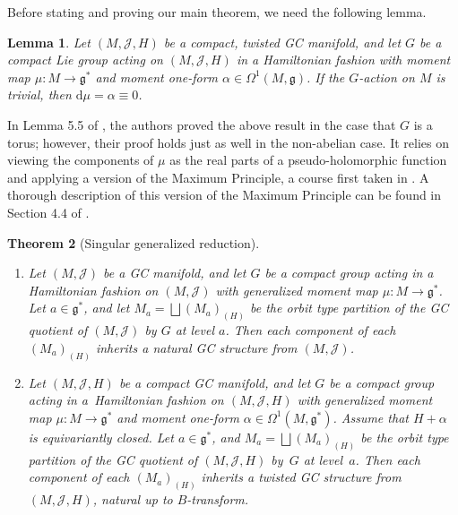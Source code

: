 \documentclass[pdftex]{sigma}
\newtheorem{Theorem}{Theorem}[section]
\newtheorem{Lemma}[Theorem]{Lemma}
\numberwithin{equation}{section}
\newcommand{\func}[3]{#1 \colon #2 \to #3}
\newcommand{\litlet}{\renewcommand{\labelenumi}{(\alph{enumi})}}
\begin{document}
Before stating and proving our main theorem, we need the following lemma.


\begin{Lemma} \label{lem1}
Let $(M,\mathcal{J},H)$ be a \emph{compact}, twisted GC manifold, and let $G$ be a compact Lie group acting on $(M,\mathcal{J},H)$ in a Hamiltonian fashion with moment map $\func{\mu}{M}{\mathfrak{g}^*}$ and moment one-form $\alpha \in \Omega^1(M,\mathfrak{g})$.
If the $G$-action on $M$ is trivial, then $\mathrm{d} \mu = \alpha \equiv 0$.
\end{Lemma}


In Lemma 5.5 of \cite{linbaird}, the authors proved the above result in the case that $G$ is a torus;  however, their proof holds just as well in the non-abelian case.  It relies on viewing the components of $\mu$ as the real parts of a pseudo-holomorphic function and applying a version of the Maximum Principle, a course f\/irst taken in \cite{nitta}.  A thorough description of this version of the Maximum Principle can be found in Section 4.4 of \cite{MyThesis}.

\begin{Theorem}[Singular generalized reduction] \label{MainThm} \qquad
\begin{enumerate} \itemsep=0pt\litlet
  \item Let $(M,\mathcal{J})$ be a GC manifold, and let $G$ be a compact group acting in a Hamiltonian fashion on $(M,\mathcal{J})$ with generalized moment map $\func{\mu}{M}{\mathfrak{g}^*}$.  Let $a \in \mathfrak{g}^*$, and let $M_a = \bigsqcup (M_{a})_{(H)}$ be the orbit type partition of the GC quotient of $(M,\mathcal{J})$ by $G$ at level $a$.
  Then each component of each $\left( M_{a} \right)_{(H)}$ inherits a natural GC structure from $(M,\mathcal{J})$.

  \item Let $(M,\mathcal{J},H)$ be a \emph{compact} GC manifold, and let $G$ be a compact group acting in a~Hamiltonian fashion on $(M,\mathcal{J},H)$ with generalized moment map $\func{\mu}{M}{\mathfrak{g}^*}$ and moment one-form $\alpha \in \Omega^1(M,\mathfrak{g}^*)$.  Assume that $H+\alpha$ is equivariantly closed.
Let $a \in \mathfrak{g}^*$, and $M_a = \bigsqcup (M_{a})_{(H)}$ be the orbit type partition of the GC quotient of $(M,\mathcal{J},H)$ by~$G$ at level~$a$.
  Then each component of each $\left( M_{a} \right)_{(H)}$ inherits a twisted GC structure from $(M,\mathcal{J},H)$, natural up to $B$-transform.
\end{enumerate}
\end{Theorem}
\end{document}
